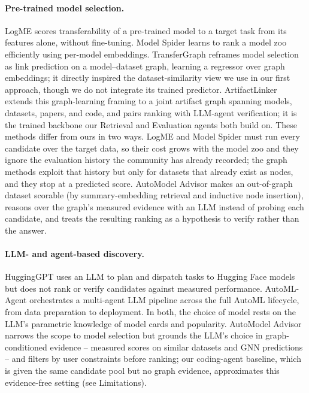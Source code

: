 
\paragraph{Pre-trained model selection.} LogME \citep{you2021logme} scores transferability of a pre-trained model to a target task from its features alone, without fine-tuning. Model Spider \citep{zhang2023modelspider} learns to rank a model zoo efficiently using per-model embeddings. TransferGraph \citep{li2024transfergraph} reframes model selection as link prediction on a model--dataset graph, learning a regressor over graph embeddings; it directly inspired the dataset-similarity view we use in our first approach, though we do not integrate its trained predictor. ArtifactLinker \citep{yu2026artifactlinker} extends this graph-learning framing to a joint artifact graph spanning models, datasets, papers, and code, and pairs ranking with LLM-agent verification; it is the trained backbone our Retrieval and Evaluation agents both build on. These methods differ from ours in two ways. LogME and Model Spider must run every candidate over the target data, so their cost grows with the model zoo and they ignore the evaluation history the community has already recorded; the graph methods exploit that history but only for datasets that already exist as nodes, and they stop at a predicted score. AutoModel Advisor makes an out-of-graph dataset scorable (by summary-embedding retrieval and inductive node insertion), reasons over the graph's measured evidence with an LLM instead of probing each candidate, and treats the resulting ranking as a hypothesis to verify rather than the answer.

\paragraph{LLM- and agent-based discovery.} HuggingGPT \citep{shen2023hugginggpt} uses an LLM to plan and dispatch tasks to Hugging Face models but does not rank or verify candidates against measured performance. AutoML-Agent \citep{trirat2024automlagent} orchestrates a multi-agent LLM pipeline across the full AutoML lifecycle, from data preparation to deployment. In both, the choice of model rests on the LLM's parametric knowledge of model cards and popularity. AutoModel Advisor narrows the scope to model selection but grounds the LLM's choice in graph-conditioned evidence -- measured scores on similar datasets and GNN predictions -- and filters by user constraints before ranking; our coding-agent baseline, which is given the same candidate pool but no graph evidence, approximates this evidence-free setting (see Limitations).

